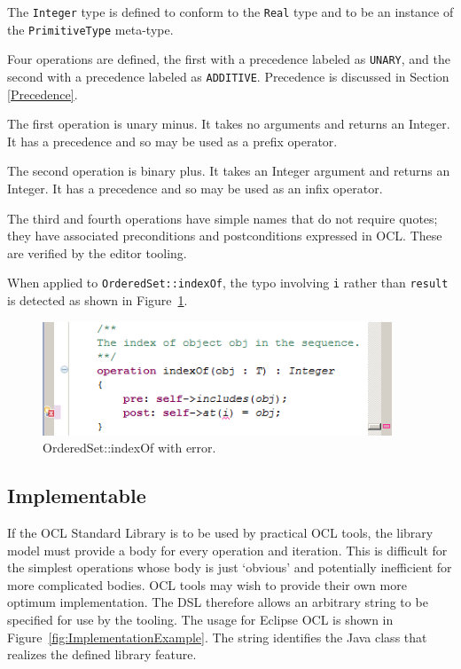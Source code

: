 \documentclass{eceasst}
\begin{document}
The \verb|Integer| type is defined to conform to the \verb|Real| type and to be an instance of the \verb|PrimitiveType| meta-type.

Four operations are defined, the first with a precedence labeled as \verb|UNARY|, and the second with a precedence labeled as \verb|ADDITIVE|. Precedence is discussed in Section \ref{Precedence}.

The first operation is unary minus. It takes no arguments and returns an Integer. It has a precedence and so may be used as a prefix operator.

The second operation is binary plus. It takes an Integer argument and returns an Integer. It has a precedence and so may be used as an infix operator.

The third and fourth operations have simple names that do not require quotes; they have associated preconditions and postconditions expressed in OCL. These are verified by the editor tooling.

When applied to \verb|OrderedSet::indexOf|, the typo involving \verb|i| rather than \verb|result| is detected as shown in Figure~\ref{fig:OrderedSet_indexOf}.

\begin{figure}
  \begin{center}
    \includegraphics[width=4.1in]{OrderedSet_indexOf.png}
  \end{center}
  \caption{OrderedSet::indexOf with error.}
  \label{fig:OrderedSet_indexOf}
\end{figure}

\subsection{Implementable}

If the OCL Standard Library is to be used by practical OCL tools, the library model must provide a body for every operation and iteration. This is difficult for the simplest operations whose body is just `obvious' and potentially inefficient for more complicated bodies. OCL tools may wish to provide their own more optimum implementation. The DSL therefore allows an arbitrary string to be specified for use by the tooling. The usage for Eclipse OCL is shown in Figure~\ref{fig:ImplementationExample}. The string identifies the Java class that realizes the defined library feature.
\end{document}
